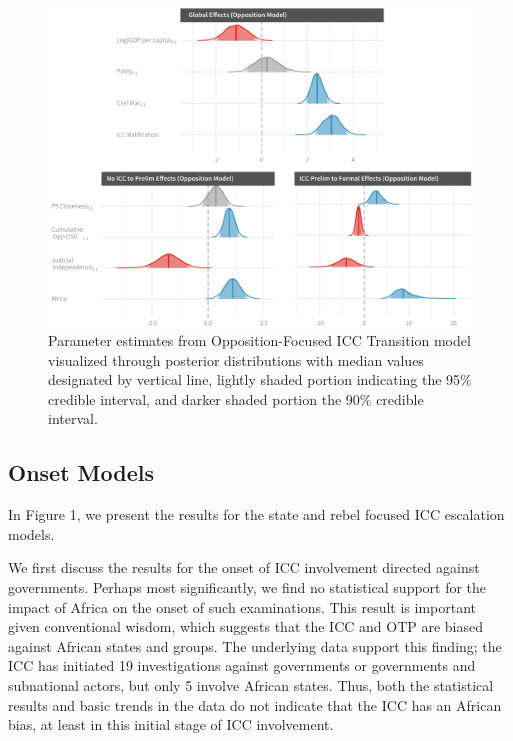 \begin{figure}
    \centering
    \includegraphics[width=1\textwidth]{rebelCoefSumm.pdf}
    \caption{Parameter estimates from Opposition-Focused ICC Transition model visualized through posterior distributions with median values designated by vertical line, lightly shaded portion indicating the 95\% credible interval, and darker shaded portion the 90\% credible interval.}
    \label{fig:rebelModel}
\end{figure}


\subsection*{Onset Models}

In Figure 1, we present the results for the state and rebel focused ICC escalation models.

We first discuss the results for the onset of ICC involvement directed against governments.  Perhaps most significantly, we find no statistical support for the impact of Africa on the onset of such examinations. This result is important given conventional wisdom, which suggests that the ICC and OTP are biased against African states and groups.  The underlying data support this finding; the ICC has initiated 19 investigations against governments or governments and subnational actors, but only 5 involve African states. Thus, both the statistical results and basic trends in the data do not indicate that the ICC has an African bias, at least in this initial stage of ICC involvement.

